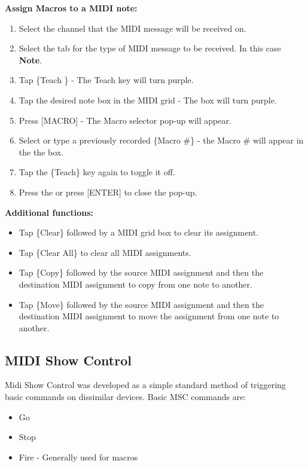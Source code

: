 \documentclass[
]{article}
\begin{document}
\textbf{Assign Macros to a MIDI note:}

\begin{enumerate}
\def\labelenumi{\arabic{enumi}.}
\item
  Select the channel that the MIDI message will be received on.
\item
  Select the tab for the type of MIDI message to be received. In this case \textbf{Note}.
\item
  Tap \{Teach \} - The Teach key will turn purple.
\item
  Tap the desired note box in the MIDI grid - The box will turn purple.
\item
  Press {[}MACRO{]} - The Macro selector pop-up will appear.
\item
  Select or type a previously recorded \{Macro \#\} - the Macro \# will appear in the the box.
\item
  Tap the \{Teach\} key again to toggle it off.
\item
  Press the or press {[}ENTER{]} to close the pop-up.
\end{enumerate}

\textbf{Additional functions:}

\begin{itemize}
\item
  Tap \{Clear\} followed by a MIDI grid box to clear its assignment.
\item
  Tap \{Clear All\} to clear all MIDI assignments.
\item
  Tap \{Copy\} followed by the source MIDI assignment and then the destination MIDI assignment to copy from one note to another.
\item
  Tap \{Move\} followed by the source MIDI assignment and then the destination MIDI assignment to move the assignment from one note to another.
\end{itemize}

\hypertarget{midi-show-control}{%
\subsection{MIDI Show Control}\label{midi-show-control}}

Midi Show Control was developed as a simple standard method of triggering basic commands on dissimilar devices. Basic MSC commands are:

\begin{itemize}
\item
  Go
\item
  Stop
\item
  Fire - Generally used for macros
\end{itemize}
\end{document}
